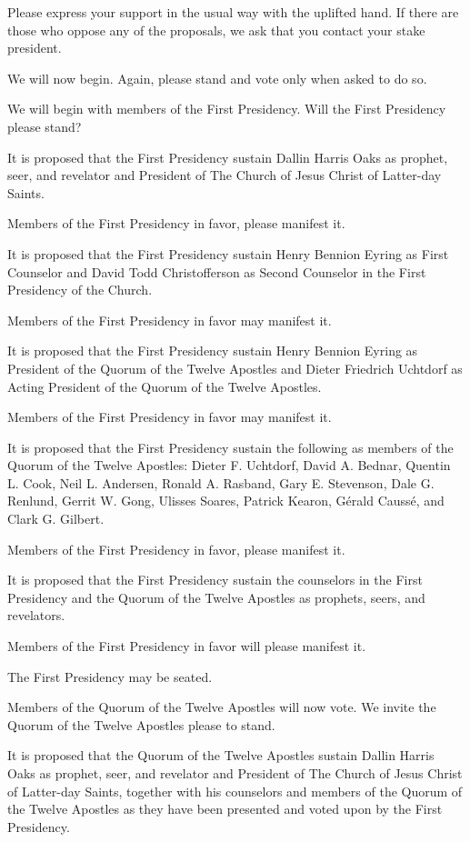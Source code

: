 \documentclass[letterpaper, 11pt]{report}
\begin{document}
Please express your support in the usual way with the uplifted hand. If there are those who oppose any of the proposals, we ask that you contact your stake president.

We will now begin. Again, please stand and vote only when asked to do so.

We will begin with members of the First Presidency. Will the First Presidency please stand?

It is proposed that the First Presidency sustain Dallin Harris Oaks as prophet, seer, and revelator and President of The Church of Jesus Christ of Latter-day Saints.

Members of the First Presidency in favor, please manifest it.

It is proposed that the First Presidency sustain Henry Bennion Eyring as First Counselor and David Todd Christofferson as Second Counselor in the First Presidency of the Church.

Members of the First Presidency in favor may manifest it.

It is proposed that the First Presidency sustain Henry Bennion Eyring as President of the Quorum of the Twelve Apostles and Dieter Friedrich Uchtdorf as Acting President of the Quorum of the Twelve Apostles.

Members of the First Presidency in favor may manifest it.

It is proposed that the First Presidency sustain the following as members of the Quorum of the Twelve Apostles: Dieter F. Uchtdorf, David A. Bednar, Quentin L. Cook, Neil L. Andersen, Ronald A. Rasband, Gary E. Stevenson, Dale G. Renlund, Gerrit W. Gong, Ulisses Soares, Patrick Kearon, Gérald Caussé, and Clark G. Gilbert.

Members of the First Presidency in favor, please manifest it.

It is proposed that the First Presidency sustain the counselors in the First Presidency and the Quorum of the Twelve Apostles as prophets, seers, and revelators.

Members of the First Presidency in favor will please manifest it.

The First Presidency may be seated.

Members of the Quorum of the Twelve Apostles will now vote. We invite the Quorum of the Twelve Apostles please to stand.

It is proposed that the Quorum of the Twelve Apostles sustain Dallin Harris Oaks as prophet, seer, and revelator and President of The Church of Jesus Christ of Latter-day Saints, together with his counselors and members of the Quorum of the Twelve Apostles as they have been presented and voted upon by the First Presidency.
\end{document}
